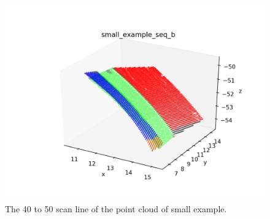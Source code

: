 \documentclass[a4paper,12pt]{article}
\begin{document}
   \begin{figure}[H]
  \begin{center}
      \includegraphics[scale=0.99]{small_example_seq_b.png}
\end{center}
\caption{The 40 to 50 scan line of the point cloud of small example.}
 \label{fig:40_50_sml_origin}
 \end{figure}
 

 
\end{document}
